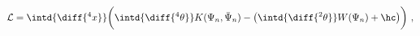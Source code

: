 \begin{equation}
  \label{eq:nonlocalintro}
    \mathcal{L} = \intd{\diff{^4x}} \biggl( \intd{\diff{^4 \theta}} K(\Psi_n,
  \bar{\Psi}_n) - \bigl(\intd{\diff{^2 \theta}} W(\Psi_n) + \hc \bigr) \biggr)\ ,
\end{equation}


